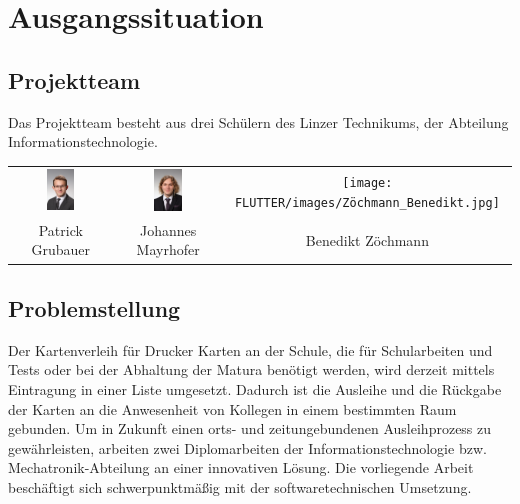 \chapter{Ausgangssituation}
\section{Projektteam}
Das Projektteam besteht aus drei Schülern des Linzer Technikums, der Abteilung
Informationstechnologie.

\vspace{1cm}
\begin{table}[htbp]
  \centering
  \begin{tabular}{ccc}
    \includegraphics[width=0.3\textwidth]{FLUTTER/images/Grubauer_Patrick.jpg} &
    \includegraphics[width=0.3\textwidth]{FLUTTER/images/Mayrhofer_Johannes_2.jpg} &
    \texttt{[image: FLUTTER/images/Zöchmann\_Benedikt.jpg]} \\
    Patrick Grubauer &
    Johannes Mayrhofer &
    Benedikt Zöchmann \\
  \end{tabular}
  \label{tab:example}
\end{table}

\newpage

\section{Problemstellung}
Der Kartenverleih für Drucker Karten an der Schule, die für Schularbeiten und Tests oder bei der Abhaltung der Matura benötigt werden, wird derzeit mittels Eintragung in einer Liste umgesetzt. Dadurch ist die Ausleihe und die Rückgabe der Karten an die Anwesenheit von Kollegen in einem bestimmten Raum gebunden. Um in Zukunft einen orts- und zeitungebundenen Ausleihprozess zu gewährleisten, arbeiten zwei Diplomarbeiten der Informationstechnologie bzw. Mechatronik-Abteilung an einer innovativen Lösung. Die vorliegende Arbeit beschäftigt sich schwerpunktmäßig mit der softwaretechnischen Umsetzung.

